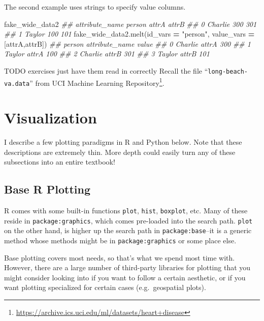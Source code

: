 \documentclass[
  12pt,
  krantz2]{krantz}
\makeatletter
\newenvironment{Shaded}{\begin{snugshade}}{\end{snugshade}}
\newcommand{\CommentTok}[1]{\textcolor[rgb]{0.37,0.37,0.37}{\textit{#1}}}
\newcommand{\NormalTok}[1]{#1}
\newcommand{\OperatorTok}[1]{\textcolor[rgb]{0.43,0.43,0.43}{\textbf{#1}}}
\newcommand{\StringTok}[1]{\textcolor[rgb]{0.5,0.5,0.5}{#1}}
\renewcommand{\href}[2]{#2\footnote{\url{#1}}}
\newenvironment{kframe}{%
\medskip{}
\setlength{\fboxsep}{.8em}
 \def\at@end@of@kframe{}%
 \ifinner\ifhmode%
  \def\at@end@of@kframe{\end{minipage}}%
  \begin{minipage}{\columnwidth}%
 \fi\fi%
 \def\FrameCommand##1{\hskip\@totalleftmargin \hskip-\fboxsep
 \colorbox{shadecolor}{##1}\hskip-\fboxsep
     \hskip-\linewidth \hskip-\@totalleftmargin \hskip\columnwidth}%
 \MakeFramed {\advance\hsize-\width
   \@totalleftmargin\z@ \linewidth\hsize
   \@setminipage}}%
 {\par\unskip\endMakeFramed%
 \at@end@of@kframe}
\renewenvironment{Shaded}{\begin{kframe}}{\end{kframe}}
\makeatother
\begin{document}
The second example uses strings to specify value columns.

\begin{Shaded}
\begin{Highlighting}[]
\NormalTok{fake\_wide\_data2}
\CommentTok{\#\# attribute\_name   person  attrA  attrB}
\CommentTok{\#\# 0               Charlie    300    301}
\CommentTok{\#\# 1                Taylor    100    101}
\NormalTok{fake\_wide\_data2.melt(id\_vars }\OperatorTok{=} \StringTok{"person"}\NormalTok{, value\_vars }\OperatorTok{=}\NormalTok{ [}\StringTok{\textquotesingle{}attrA\textquotesingle{}}\NormalTok{,}\StringTok{\textquotesingle{}attrB\textquotesingle{}}\NormalTok{])}
\CommentTok{\#\#     person attribute\_name  value}
\CommentTok{\#\# 0  Charlie          attrA    300}
\CommentTok{\#\# 1   Taylor          attrA    100}
\CommentTok{\#\# 2  Charlie          attrB    301}
\CommentTok{\#\# 3   Taylor          attrB    101}
\end{Highlighting}
\end{Shaded}

TODO exercises just have them read in correctly Recall the file ``\texttt{long-beach-va.data}'' from \href{https://archive.ics.uci.edu/ml/datasets/heart+disease}{UCI Machine Learning Repository}.

\hypertarget{visualization}{%
\chapter{Visualization}\label{visualization}}

I describe a few plotting paradigms in R and Python below. Note that these descriptions are extremely thin. More depth could easily turn any of these subsections into an entire textbook!

\hypertarget{base-r-plotting}{%
\section{Base R Plotting}\label{base-r-plotting}}

R comes with some built-in functions \texttt{plot}, \texttt{hist}, \texttt{boxplot}, etc. Many of these reside in \texttt{package:graphics}, which comes pre-loaded into the search path. \texttt{plot} on the other hand, is higher up the search path in \texttt{package:base}--it is a generic method whose methods might be in \texttt{package:graphics} or some place else.

Base plotting covers most needs, so that's what we spend most time with. However, there are a large number of third-party libraries for plotting that you might consider looking into if you want to follow a certain aesthetic, or if you want plotting specialized for certain cases (e.g.~geospatial plots).
\end{document}
